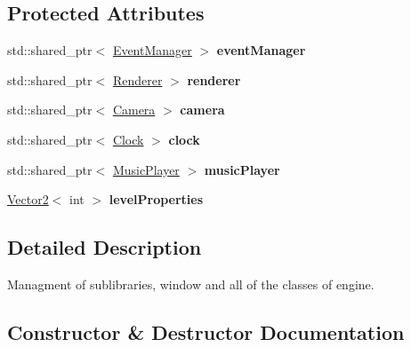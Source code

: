 \subsection*{Protected Attributes}
\begin{DoxyCompactItemize}
\item 
\hypertarget{class_virtual_1_1_device_aa1ea93335ccb046238b1fb61e1cb087f}{}\label{class_virtual_1_1_device_aa1ea93335ccb046238b1fb61e1cb087f} 
std\+::shared\+\_\+ptr$<$ \hyperlink{class_virtual_1_1_event_manager}{Event\+Manager} $>$ {\bfseries event\+Manager}
\item 
\hypertarget{class_virtual_1_1_device_a3c40ddcdd5514b6ceb8de171835aa522}{}\label{class_virtual_1_1_device_a3c40ddcdd5514b6ceb8de171835aa522} 
std\+::shared\+\_\+ptr$<$ \hyperlink{class_virtual_1_1_renderer}{Renderer} $>$ {\bfseries renderer}
\item 
\hypertarget{class_virtual_1_1_device_a34e3c67e5ed6f3aad78e69df09760079}{}\label{class_virtual_1_1_device_a34e3c67e5ed6f3aad78e69df09760079} 
std\+::shared\+\_\+ptr$<$ \hyperlink{class_virtual_1_1_camera}{Camera} $>$ {\bfseries camera}
\item 
\hypertarget{class_virtual_1_1_device_ae791d56234f12d666bc620d740690067}{}\label{class_virtual_1_1_device_ae791d56234f12d666bc620d740690067} 
std\+::shared\+\_\+ptr$<$ \hyperlink{class_virtual_1_1_clock}{Clock} $>$ {\bfseries clock}
\item 
\hypertarget{class_virtual_1_1_device_a55c94d4bf9b53bf9b48c83a0e8c861ea}{}\label{class_virtual_1_1_device_a55c94d4bf9b53bf9b48c83a0e8c861ea} 
std\+::shared\+\_\+ptr$<$ \hyperlink{class_virtual_1_1_music_player}{Music\+Player} $>$ {\bfseries music\+Player}
\item 
\hypertarget{class_virtual_1_1_device_aa2bf96683fa3d4fec7b1db02e81caa0b}{}\label{class_virtual_1_1_device_aa2bf96683fa3d4fec7b1db02e81caa0b} 
\hyperlink{struct_virtual_1_1_vector2}{Vector2}$<$ int $>$ {\bfseries level\+Properties}
\end{DoxyCompactItemize}


\subsection{Detailed Description}
Managment of sublibraries, window and all of the classes of engine. 

\subsection{Constructor \& Destructor Documentation}
\hypertarget{class_virtual_1_1_device_a01750717800affee98304503b6e7394d}{}\label{class_virtual_1_1_device_a01750717800affee98304503b6e7394d} 
